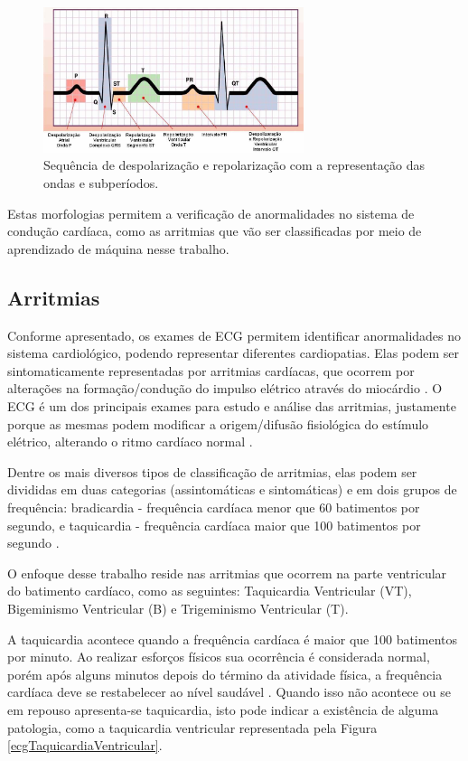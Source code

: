 \documentclass[conference]{IEEEtran}
\begin{document}
\begin{figure}[!h]
	\centering
	\includegraphics[width=3in]{img/sequenciaDespolarizacacoPolarizacao}
	\caption{Sequência de despolarização e repolarização com a representação das ondas e subperíodos.}
	\label{sequenciaDespolarizacacoPolarizacao}
\end{figure}

Estas morfologias permitem a verificação de anormalidades no sistema de condução cardíaca, como as arritmias que vão ser classificadas por meio de aprendizado de máquina nesse trabalho.

\subsection{Arritmias}

Conforme apresentado, os exames de ECG permitem identificar anormalidades no sistema cardiológico, podendo representar diferentes cardiopatias. Elas podem ser sintomaticamente representadas por arritmias cardíacas, que ocorrem por alterações na formação/condução do impulso elétrico através do miocárdio \cite{sbc03}. O ECG é um dos principais exames para estudo e análise das arritmias, justamente porque as mesmas podem modificar a origem/difusão fisiológica do estímulo elétrico, alterando o ritmo cardíaco normal \cite{goncalves95}.

Dentre os mais diversos tipos de classificação de arritmias, elas podem ser divididas em duas categorias (assintomáticas e sintomáticas) e em dois grupos de frequência: bradicardia - frequência cardíaca menor que 60 batimentos por segundo, e taquicardia - frequência cardíaca maior que 100 batimentos por segundo \cite{guyton06}.

O enfoque desse trabalho reside nas arritmias que ocorrem na parte ventricular do batimento cardíaco, como as seguintes: Taquicardia Ventricular (VT), Bigeminismo Ventricular (B) e Trigeminismo Ventricular (T).

A taquicardia acontece quando a frequência cardíaca é maior que 100 batimentos por minuto. Ao realizar esforços físicos sua ocorrência é considerada normal, porém após alguns minutos depois do término da atividade física, a frequência cardíaca deve se restabelecer ao nível saudável \cite{beckert09}. Quando isso não acontece ou se em repouso apresenta-se taquicardia, isto pode indicar a existência de alguma patologia, como a taquicardia ventricular representada pela Figura \ref{ecgTaquicardiaVentricular}.
\end{document}
